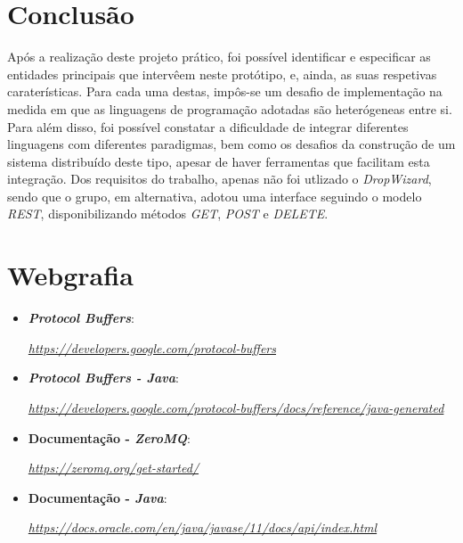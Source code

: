 \documentclass[a4paper]{report}
\begin{document}
\chapter{Conclusão}
Após a realização deste projeto prático, foi possível identificar e especificar as entidades principais que intervêem neste protótipo, e, ainda, as suas respetivas caraterísticas. Para cada uma destas, impôs-se um desafio 
de implementação na medida em que as linguagens de programação adotadas são heterógeneas entre si.
Para além disso, foi possível constatar a dificuldade de integrar diferentes linguagens com diferentes paradigmas, bem como os desafios da construção de um sistema distribuído deste tipo, apesar de haver ferramentas que facilitam esta integração.
Dos requisitos do trabalho, apenas não foi utlizado o \textit{DropWizard}, sendo que o grupo, em alternativa, adotou uma interface seguindo o modelo \textit{REST}, disponibilizando métodos \textit{GET}, \textit{POST} e \textit{DELETE}.

\chapter{Webgrafia}
	\begin{itemize}
		\item \textbf{\textit{Protocol Buffers}}:
		\par \textit{\url{https://developers.google.com/protocol-buffers}}
        \item \textbf{\textit{Protocol Buffers - Java}}:
		\par \textit{\url{https://developers.google.com/protocol-buffers/docs/reference/java-generated}}
		\item \textbf{Documentação - \textit{ZeroMQ}}:
		\par \textit{\url{https://zeromq.org/get-started/}}
		\item \textbf{Documentação - \textit{Java}}:
		\par \textit{\url{https://docs.oracle.com/en/java/javase/11/docs/api/index.html}}
    \end{itemize}
\end{document}
